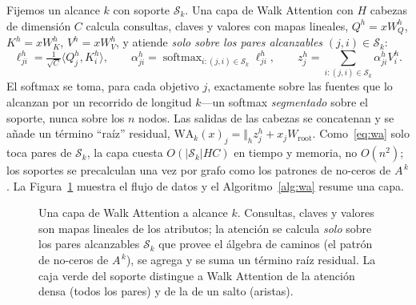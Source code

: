 \documentclass[runningheads]{llncs}
\newcommand{\Adj}{A}
\DeclareMathOperator{\softmax}{softmax}
\begin{document}
Fijemos un alcance $k$ con soporte $\mathcal{S}_k$. Una capa de Walk Attention
con $H$ cabezas de dimensión $C$ calcula consultas, claves y valores con mapas
lineales, $Q^h=xW^h_Q$, $K^h=xW^h_K$, $V^h=xW^h_V$, y atiende \emph{solo sobre
los pares alcanzables} $(j,i)\in\mathcal{S}_k$:
\begin{equation}\label{eq:wa}
  \ell^h_{ji} = \tfrac{1}{\sqrt{C}}\langle Q^h_j,K^h_i\rangle,\qquad
  \alpha^h_{ji} = \softmax_{i:(j,i)\in\mathcal{S}_k}\ell^h_{ji},\qquad
  z^h_j = \textstyle\sum_{i:(j,i)\in\mathcal{S}_k}\alpha^h_{ji}V^h_i.
\end{equation}
El softmax se toma, para cada objetivo $j$, exactamente sobre las fuentes que
lo alcanzan por un recorrido de longitud $k$---un softmax \emph{segmentado}
sobre el soporte, nunca sobre los $n$ nodos. Las salidas de las cabezas se
concatenan y se añade un término ``raíz'' residual,
$\mathrm{WA}_k(x)_j=\Vert_h z^h_j + x_jW_{\!\text{root}}$. Como~\eqref{eq:wa}
solo toca pares de $\mathcal{S}_k$, la capa cuesta $O(|\mathcal{S}_k|HC)$ en
tiempo y memoria, no $O(n^2)$; los soportes se precalculan una vez por grafo
como los patrones de no-ceros de $\Adj^{\,k}$. La Figura~\ref{fig:layer}
muestra el flujo de datos y el Algoritmo~\ref{alg:wa} resume una capa.

\begin{figure}[t]
\centering
{}
\caption{Una capa de Walk Attention a alcance $k$. Consultas, claves y valores
son mapas lineales de los atributos; la atención se calcula \emph{solo} sobre
los pares alcanzables $\mathcal{S}_k$ que provee el álgebra de caminos (el
patrón de no-ceros de $\Adj^{\,k}$), se agrega y se suma un término raíz
residual. La caja verde del soporte distingue a Walk Attention de la atención
densa (todos los pares) y de la de un salto (aristas).}
\label{fig:layer}
\end{figure}
\end{document}

